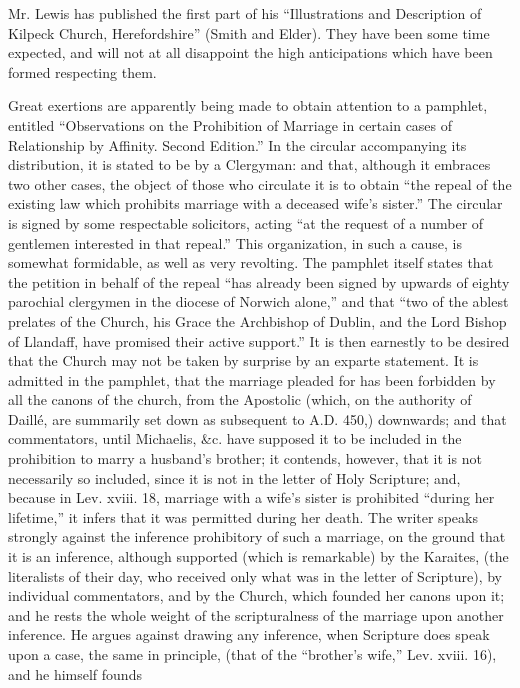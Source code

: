 Mr. Lewis has published the first part of his ``Illustrations
and Description of Kilpeck Church, Herefordshire'' (Smith and Elder).
They have been some time expected, and will not at all disappoint the
high anticipations which have been formed respecting them.

Great exertions are apparently being made to obtain
attention to a pamphlet, entitled ``Observations on the Prohibition of
Marriage in certain cases of Relationship by Affinity. Second Edition.''
In the circular accompanying its distribution, it is stated to be by a
Clergyman: and that, although it embraces two other cases, the object of
those who circulate it is to obtain ``the repeal of the existing law
which prohibits marriage with a deceased wife's sister.'' The circular is
signed by some respectable solicitors, acting ``at the request of a
number of gentlemen interested in that repeal.'' This organization, in
such a cause, is somewhat formidable, as well as very revolting. The
pamphlet itself states that the petition in behalf of the repeal ``has
already been signed by upwards of eighty parochial clergymen in the
diocese of Norwich alone,'' and that ``two of the ablest prelates of the
Church, his Grace the Archbishop of Dublin, and the Lord Bishop of
Llandaff, have promised their active support.'' It is then earnestly to
be desired that the Church may not be taken by surprise by an exparte
statement. It is admitted in the pamphlet, that the marriage pleaded for
has been forbidden by all the canons of the church, from the Apostolic
(which, on the authority of Daillé, are summarily set down as
subsequent to A.D. 450,) downwards; and that commentators,
until Michaelis, \&c. have supposed it to be included in the
prohibition to marry a husband's brother; it contends, however, that it
is not necessarily so included, since it is not in the letter of Holy
Scripture; and, because in Lev. xviii. 18, marriage with a wife's sister
is prohibited ``during her lifetime,'' it infers that it was permitted
during her death. The writer speaks strongly against the inference
prohibitory of such a marriage, on the ground that it is an inference,
although supported (which is remarkable) by the Karaites, (the
literalists of their day, who received only what was in the letter of
Scripture), by individual commentators, and by the Church, which founded
her canons upon it; and he rests the whole weight of the scripturalness
of the marriage upon another inference. He argues against drawing any
inference, when Scripture does speak upon a case, the same in principle,
(that of the ``brother's wife,'' Lev. xviii. 16), and he himself founds
